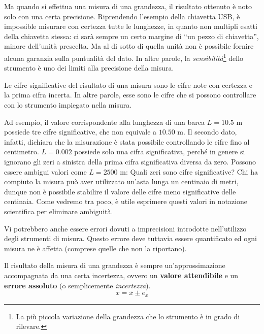 Ma quando si effettua una misura di una grandezza, il risultato ottenuto è noto solo
con una certa precisione. Riprendendo l'esempio della chiavetta USB, è impossible
misurare con certezza tutte le lunghezze, in quanto non multipli esatti della
chiavetta stessa: ci sarà sempre un certo margine di ``un pezzo di chiavetta'',
minore dell'unità prescelta. Ma al di sotto di quella unità non è possibile
fornire alcuna garanzia sulla puntualità del dato. In altre parole, la
\textit{sensibilità}\footnote{La più piccola variazione della grandezza che lo
strumento è in grado di rilevare.} dello strumento è uno dei limiti alla precisione
della misura.

\vspace{8pt}
\begin{tcolorbox}[colback = yellow!30, colframe = yellow!30!black, title = {Cifre significative del risultato di una misura}]
Le cifre significative del risultato di una misura sono le cifre note
con certezza e la prima cifra incerta. In altre parole, esse sono le cifre che si
possono controllare con lo strumento impiegato nella misura.
\end{tcolorbox}
\vspace{5pt}

\noindent Ad esempio, il valore corrispondente alla lunghezza di una barca $L = 10.5$ m
possiede tre cifre significative, che non equivale a $10.50$ m. Il secondo dato,
infatti, dichiara che la misurazione è stata possibile controllando le cifre
fino al centimetro. $L = 0.002$ possiede solo una cifra significativa, perché
in genere si ignorano gli zeri a sinistra della prima cifra significativa diversa
da zero. Possono essere ambigui valori come $L = 2500 \text{ m}$: Quali zeri sono
cifre significative? Chi ha compiuto la misura può aver utilizzato un'asta lunga
un centinaio di metri, dunque non è possibile stabilire il valore delle cifre
meno significative delle centinaia. Come vedremo tra poco, è utile esprimere questi valori in
notazione scientifica per eliminare ambiguità.

Vi potrebbero anche essere errori dovuti a imprecisioni introdotte nell'utilizzo
degli strumenti di misura. Questo errore deve tuttavia essere quantificato ed ogni
misura ne è affetta (comprese quelle che non la riportano).

\vspace{8pt}
\begin{tcolorbox}[colback = yellow!30, colframe = yellow!30!black, title = {Risultato della misura di una grandezza}]
Il risultato della misura di una grandezza è sempre un'approssimazione
accompagnata da una certa incertezza, ovvero un \textbf{valore attendibile}
e un \textbf{errore assoluto} (o semplicemente \textit{incertezza}).
\[ x = \overline{x} \pm e_x  \]
\end{tcolorbox}
\vspace{5pt}

